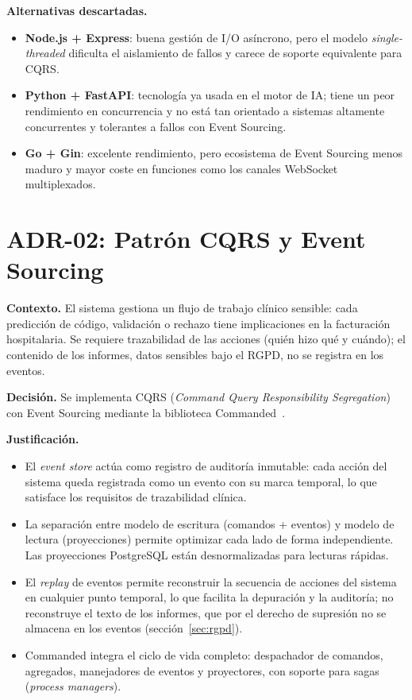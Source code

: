 \textbf{Alternativas descartadas.}
\begin{itemize}
    \item \textbf{Node.js + Express}: buena gestión de I/O asíncrono, pero el modelo \emph{single-threaded} dificulta el aislamiento de fallos y carece de soporte equivalente para CQRS.
    \item \textbf{Python + FastAPI}: tecnología ya usada en el motor de IA; tiene un peor rendimiento en concurrencia y no está tan orientado a sistemas altamente concurrentes y tolerantes a fallos con Event Sourcing.
    \item \textbf{Go + Gin}: excelente rendimiento, pero ecosistema de Event Sourcing menos maduro y mayor coste en funciones como los canales WebSocket multiplexados.
\end{itemize}

\section{ADR-02: Patrón CQRS y Event Sourcing}

\textbf{Contexto.} El sistema gestiona un flujo de trabajo clínico sensible: cada predicción de código, validación o rechazo tiene implicaciones en la facturación hospitalaria. Se requiere trazabilidad de las acciones (quién hizo qué y cuándo); el contenido de los informes, datos sensibles bajo el RGPD, no se registra en los eventos.

\textbf{Decisión.} Se implementa CQRS (\emph{Command Query Responsibility Segregation}) con Event Sourcing mediante la biblioteca Commanded~\cite{commanded2024}.

\textbf{Justificación.}
\begin{itemize}
    \item El \emph{event store} actúa como registro de auditoría inmutable: cada acción del sistema queda registrada como un evento con su marca temporal, lo que satisface los requisitos de trazabilidad clínica.
    \item La separación entre modelo de escritura (comandos + eventos) y modelo de lectura (proyecciones) permite optimizar cada lado de forma independiente. Las proyecciones PostgreSQL están desnormalizadas para lecturas rápidas.
    \item El \emph{replay} de eventos permite reconstruir la secuencia de acciones del sistema en cualquier punto temporal, lo que facilita la depuración y la auditoría; no reconstruye el texto de los informes, que por el derecho de supresión no se almacena en los eventos (sección~\ref{sec:rgpd}).
    \item Commanded integra el ciclo de vida completo: despachador de comandos, agregados, manejadores de eventos y proyectores, con soporte para sagas (\emph{process managers}).
\end{itemize}

